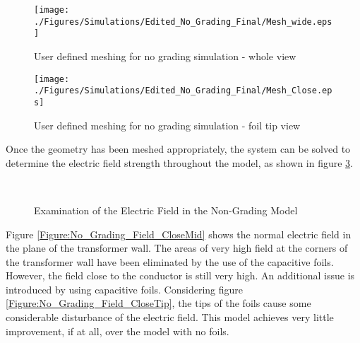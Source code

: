 \begin{figure}[!h]
  \centering
    \texttt{[image: ./Figures/Simulations/Edited\_No\_Grading\_Final/Mesh\_wide.eps]} 
	\caption{User defined meshing for no grading simulation - whole view}
\label{Figure:No_Grading_Mesh1}
\end{figure}

\begin{figure}[!h]
  \centering
    \texttt{[image: ./Figures/Simulations/Edited\_No\_Grading\_Final/Mesh\_Close.eps]} 
	\caption{User defined meshing for no grading simulation - foil tip view}
\label{Figure:No_Grading_Mesh2}
\end{figure}

Once the geometry has been meshed appropriately, the system can be solved to determine the electric field strength throughout the model, as shown in figure \ref{Figure:No_Grading_Fieldxy}.


\begin{figure}[!h]
  \centering
   \\

 \quad
{}
\caption{Examination of the Electric Field in the Non-Grading Model}
\label{Figure:No_Grading_Fieldxy}
\end{figure}

Figure \ref{Figure:No_Grading_Field_CloseMid} shows the normal electric field in the plane of the transformer wall. 
The areas of very high field at the corners of the transformer wall have been eliminated by the use of the capacitive foils.
However, the field close to the conductor is still very high.
An additional issue is introduced by using capacitive foils.
Considering figure \ref{Figure:No_Grading_Field_CloseTip}, the tips of the foils cause some considerable disturbance of the electric field.
This model achieves very little improvement, if at all, over the model with no foils.

